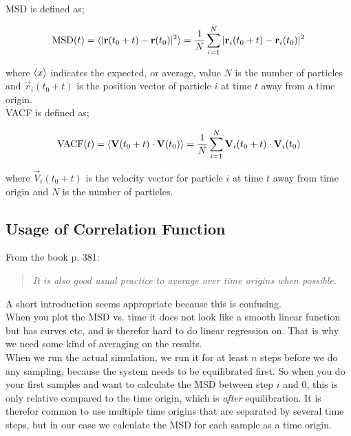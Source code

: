 \documentclass{article}
\begin{document}
MSD is defined as;

\begin{eqnarray}
    \mathrm{MSD}(t) = \langle |{\bf r}(t_0 + t) - {\bf r}(t_0)|^2 \rangle
    = \frac{1}{N} \sum_{i=1}^N | {\bf r}_i(t_0 + t) - {\bf r}_i(t_0)  |^2
\end{eqnarray}

where $\langle x \rangle$ indicates the expected, or average, value
$N$ is the number of particles and
$\vec{r}_i(t_0 + t)$ is the position vector of particle $i$ at time $t$ away from a time origin.\\

VACF is defined as;

\begin{eqnarray}
    \mathrm{VACF}(t) = \langle {\bf V}(t_0 + t)\cdot{\bf V}(t_0) \rangle
    = \frac{1}{N} \sum_{i=1}^N {\bf V}_i(t_0 + t) \cdot {\bf V}_i(t_0)
\end{eqnarray}

where
$\vec{V}_i(t_0 + t)$ is the velocity vector for particle $i$ at time $t$
away from time origin
and $N$ is the number of particles.

\newpage

\subsection{Usage of Correlation Function}

From the book p. 381:

\begin{quotation}
    \em
    It is also good usual practice to average over time origins when
    possible.
\end{quotation}


A short introduction seems appropriate because this is confusing.\\

When you plot the MSD vs. time it does not look like a smooth linear
function but has curves etc, and is therefor hard to do linear regression
on. That is why we need some kind of averaging on the results.\\

When we run the actual simulation, we run it for at least 
$n$ steps before we do any sampling, because the system needs
to be equilibrated first.
So when you do your first samples and 
want to calculate the MSD between step $i$ and $0$,
this is only relative compared to the time origin,
which is {\em after} equilibration. 
It is therefor common to use multiple time origins that are separated
by several time steps, but in our case we calculate the MSD
for each sample as a time origin.\\
\end{document}
